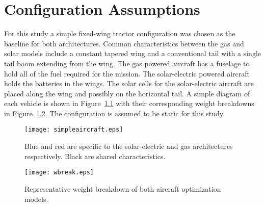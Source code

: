 
\chapter{Configuration Assumptions}

For this study a simple fixed-wing tractor configuration was chosen as the baseline for both architectures. 
Common characteristics between the gas and solar models include a constant tapered wing and a conventional tail with a single tail boom extending from the wing.  
The gas powered aircraft has a fuselage to hold all of the fuel required for the mission.  
The solar-electric powered aircraft holds the batteries in the wings.  
The solar cells for the solar-electric aircraft are placed along the wing and possibly on the horizontal tail.  
A simple diagram of each vehicle is shown in Figure~\ref{f:simpleaircraft} with their corresponding weight breakdowns in Figure~\ref{f:wbreak}.
The configuration is assumed to be static for this study.

\begin{figure}[h!]
	\begin{center}
	\texttt{[image: simpleaircraft.eps]}
    \caption{Blue and red are specific to the solar-electric and gas architectures respectively.  Black are shared characteristics.}
	\label{f:simpleaircraft}
	\end{center}
\end{figure}

\begin{figure}[h!]
	\begin{center}
	\texttt{[image: wbreak.eps]}
   \caption{Representative weight breakdown of both aircraft optimization models.}
	\label{f:wbreak}
	\end{center}
\end{figure}
